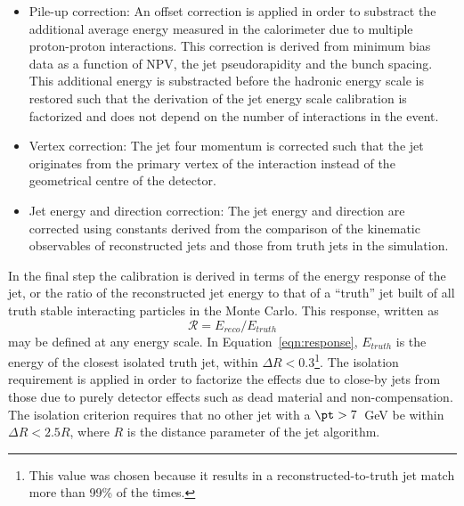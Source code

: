 %
%

 

\begin{itemize}
\item
Pile-up correction: An offset correction is applied in order to substract the additional average energy measured in the calorimeter due to multiple proton-proton interactions. This correction is derived from minimum bias data %
 as a function of NPV, the jet pseudorapidity and the bunch spacing. This additional energy is substracted before the hadronic energy scale is restored such that the derivation of the jet energy scale calibration is factorized and does not depend on the number of interactions in the event.
\item
Vertex correction: The jet four momentum is corrected such that the jet originates from the primary vertex of the interaction instead of the geometrical centre of the detector. 
\item
Jet energy and direction correction: The jet energy and direction are corrected using constants derived from the comparison of the kinematic observables of reconstructed jets and those from truth jets in the simulation.
\end{itemize}

In the final step the calibration is derived in terms of the energy response of the jet, or the ratio of the reconstructed jet energy to that of a ``truth'' jet built of all truth stable interacting particles in the Monte Carlo. This response, written as
%
\begin{equation}
\mathcal{R} = E_{reco} / E_{truth}
 \label{eqn:response}
\end{equation}
%
may be defined at any energy scale. In Equation~\ref{eqn:response}, $E_{truth}$ is the energy of the closest isolated truth jet, within $\Delta R < 0.3$\footnote{This value was chosen because it results in a reconstructed-to-truth jet match more than 99\% of the times.}.
The isolation requirement is applied in order to factorize the effects due to close-by jets from those due to purely detector effects such as dead material and non-compensation. The isolation criterion requires that no other jet with a $\pt > 7$~GeV be within $\Delta R < 2.5R$, where $R$ is the distance parameter of the jet algorithm.

